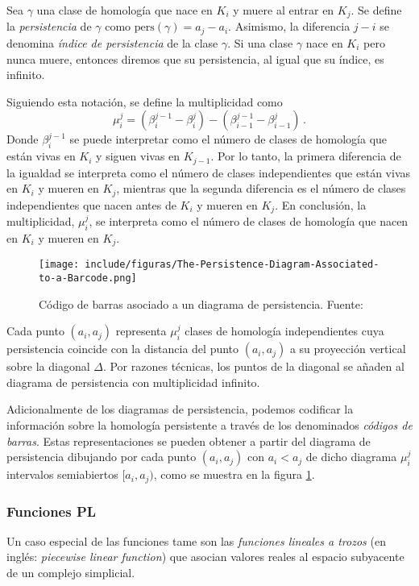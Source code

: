 \begin{definition}
Sea $\gamma$ una clase de homología que nace en $K_i$ y muere al entrar en $K_j$. Se define la \emph{persistencia} de $\gamma$ como $\text{pers}(\gamma)= a_j - a_i$. Asimismo, la diferencia $j-i$ se denomina \emph{índice de persistencia} de la clase $\gamma$. Si una clase $\gamma$ nace en $K_i$ pero nunca muere, entonces diremos que su persistencia, al igual que su índice, es infinito.
\end{definition}

Siguiendo esta notación, se define la multiplicidad como
\[
\mu_{i}^{j} = (\beta_{i}^{j-1}-\beta_{i}^{j})-(\beta_{i-1}^{j-1}-\beta_{i-1}^{j})\,.
\]
Donde $\beta_{i}^{j-1}$ se puede interpretar como el número de clases de homología que están vivas en $K_i$ y siguen vivas en $K_{j-1}$. Por lo tanto, la primera diferencia de la igualdad se interpreta como el número de clases independientes que están vivas en $K_i$ y mueren en $K_j$, mientras que la segunda diferencia es el número de clases independientes que nacen antes de $K_i$ y mueren en $K_j$. En conclusión, la multiplicidad, $\mu_{i}^{j}$, se interpreta como el número de clases de homología que nacen en $K_i$ y mueren en $K_j$.

\begin{figure}[!ht]
\centering
\texttt{[image: include/figuras/The-Persistence-Diagram-Associated-to-a-Barcode.png]} 
\caption{Código de barras asociado a un diagrama de persistencia. Fuente: \cite{articuloJustin}}
\label{ref:codigoBarras}
\end{figure}

Cada punto $(a_i, a_j)$ representa $\mu_{i}^{j}$ clases de homología independientes cuya persistencia coincide con la distancia del punto $(a_i, a_j)$ a su proyección vertical sobre la diagonal $\Delta$. Por razones técnicas, los puntos de la diagonal se añaden al diagrama de persistencia con multiplicidad infinito.

Adicionalmente de los diagramas de persistencia, podemos codificar la información sobre la homología persistente a través de los denominados \emph{códigos de barras}. Estas representaciones se pueden obtener a partir del diagrama de persistencia dibujando por cada punto $(a_i, a_j)$ con $a_i < a_j$ de dicho diagrama $\mu_{i}^{j}$ intervalos semiabiertos $[a_i, a_j)$, como se muestra en la figura \ref{ref:codigoBarras}.

\subsubsection*{Funciones PL}\label{sec:funcionesPL}
Un caso especial de las funciones tame son las \emph{funciones lineales a trozos} (en inglés: \emph{piecewise linear function}) que asocian valores reales al espacio subyacente de un complejo simplicial.

